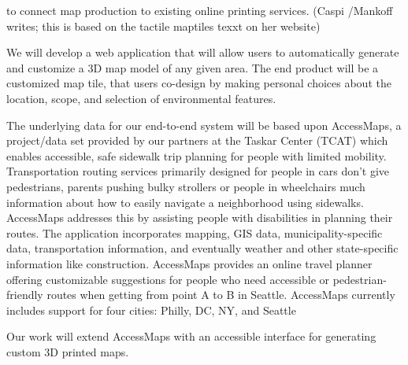to connect map production to existing online printing services. 
(Caspi /Mankoff writes; this is based on the tactile maptiles texxt on her website)

We will develop  a web application that will allow users to automatically generate and customize a 3D map model of any given area. The end product will be a customized map tile, that users co-design by making personal choices about the location, scope, and selection of environmental features.

The underlying data for our end-to-end system will be based upon AccessMaps, a project/data set provided by our partners at the Taskar Center (TCAT) which enables accessible, safe sidewalk trip planning for people with limited mobility. Transportation routing services primarily designed for people in cars don’t give pedestrians, parents pushing bulky strollers or people in wheelchairs much information about how to easily navigate a neighborhood using sidewalks. AccessMaps addresses this by assisting people with disabilities in planning their routes. The application incorporates mapping, GIS data, municipality-specific data, transportation information, and eventually weather and other state-specific information like construction. AccessMaps provides an online travel planner offering customizable suggestions for people who need accessible or pedestrian-friendly routes when getting from point A to B in Seattle.  AccessMaps currently includes support for four cities: Philly, DC, NY, and Seattle 

Our work will extend AccessMaps with an accessible interface for generating custom 3D printed maps. 




